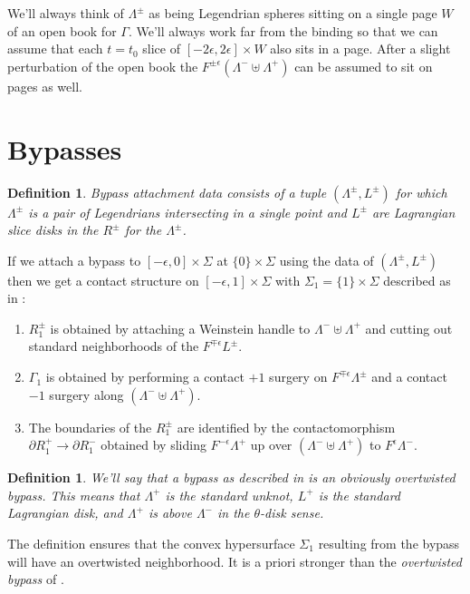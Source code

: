 \documentclass[11pt]{amsart}
\newcommand{\be}{\begin{enumerate}}
\newcommand{\ee}{\end{enumerate}}
\newcommand{\hypersurface}{\Sigma}
\newcommand{\posRegion}{R^{+}}
\newcommand{\negRegion}{R^{-}}
\newcommand{\posNegRegion}{R^{\pm}}
\newcommand{\Lag}{L}
\newcommand{\posLag}{\Lag^{+}}
\newcommand{\posNegLag}{\Lag^{\pm}}
\newcommand{\Leg}{\Lambda}
\newcommand{\posLeg}{\Leg^{+}}
\newcommand{\negLeg}{\Leg^{-}}
\newcommand{\posNegLeg}{\Leg^{\pm}}
\newcommand{\divSet}{\Gamma}
\newtheorem{defn}[thm]{Definition}
\begin{document}
We'll always think of $\posNegLeg$ as being Legendrian spheres sitting on a single page $W$ of an open book for $\divSet$. We'll always work far from the binding so that we can assume that each $t = t_{0}$ slice of $[-2\epsilon, 2\epsilon] \times W$ also sits in a page. After a slight perturbation of the open book the $F^{\pm \epsilon}(\negLeg \uplus \posLeg)$ can be assumed to sit on pages as well.

\section{Bypasses}

\begin{defn}
Bypass attachment data consists of a tuple $(\posNegLeg, \posNegLag)$ for which $\posNegLeg$ is a pair of Legendrians intersecting in a single point and $\posNegLag$ are Lagrangian slice disks in the $\posNegRegion$ for the $\posNegLeg$.
\end{defn}

If we attach a bypass to $[-\epsilon, 0] \times \hypersurface$ at $\{ 0 \} \times \hypersurface$ using the data of $(\posNegLeg, \posNegLag)$ then we get a contact structure on $[-\epsilon, 1] \times \hypersurface$ with $\hypersurface_{1} = \{1\} \times \hypersurface$ described as in \cite[Theorem 5.1.3]{HH:Bypass}:
\be
\item $\posNegRegion_{1}$ is obtained by attaching a Weinstein handle to $\negLeg \uplus \posLeg$ and cutting out standard neighborhoods of the $F^{\mp \epsilon}\posNegLag$.
\item $\divSet_{1}$ is obtained by performing a contact $+1$ surgery on $F^{\mp\epsilon}\posNegLeg$ and a contact $-1$ surgery along $(\negLeg \uplus \posLeg)$.
\item The boundaries of the $\posNegRegion_{1}$ are identified by the contactomorphism $\partial \posRegion_{1} \rightarrow \partial \negRegion_{1}$ obtained by sliding $F^{-\epsilon}\posLeg$ up over $(\negLeg \uplus \posLeg)$ to $F^{\epsilon}\negLeg$.
\ee

\begin{defn}\label{Def:OOB}
We'll say that a bypass as described in \cite[\S 10]{HH:Bypass} is an \emph{obviously overtwisted bypass}. This means that $\posLeg$ is the standard unknot, $\posLag$ is the standard Lagrangian disk, and $\posLeg$ is \emph{above} $\negLeg$ in the $\theta$-disk sense.
\end{defn}

The definition ensures that the convex hypersurface $\Sigma_{1}$ resulting from the bypass will have an overtwisted neighborhood. It is a priori stronger than the \emph{overtwisted bypass} of \cite{HH:Bypass}.
\end{document}
